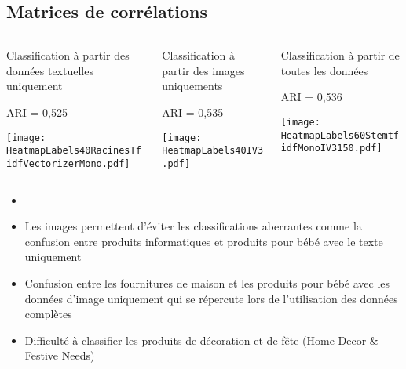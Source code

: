 \documentclass[8pt,aspectratio=169,hyperref={unicode=true}]{beamer}
\begin{document}
\subsection{Matrices de corrélations}
\begin{frame}{\insertsection}{\insertsubsection}
    \begin{columns}[t]
        \begin{column}{.33\textwidth}
            Classification à partir des données textuelles uniquement

            ARI = 0,525
            \vspace{.2cm}

            \texttt{[image: HeatmapLabels40RacinesTfidfVectorizerMono.pdf]}
        \end{column}
        \begin{column}{.33\textwidth}
            Classification à partir des images uniquements

            ARI = 0,535
            \vspace{.2cm}

            \texttt{[image: HeatmapLabels40IV3.pdf]}
        \end{column}
        \begin{column}{.33\textwidth}
            Classification à partir de toutes les données

            ARI = 0,536
            \vspace{.2cm}

            \texttt{[image: HeatmapLabels60StemtfidfMonoIV3150.pdf]}
        \end{column}
    \end{columns}
    \begin{itemize}
        \item[]
        \item Les images permettent d'éviter les classifications aberrantes comme la confusion entre produits informatiques et produits pour bébé avec le texte uniquement
        \item Confusion entre les fournitures de maison et les produits pour bébé avec les données d'image uniquement qui se répercute lors de l'utilisation des données complètes
        \item Difficulté à classifier les produits de décoration et de fête (Home Decor \& Festive Needs)
    \end{itemize}
\end{frame}
\end{document}
